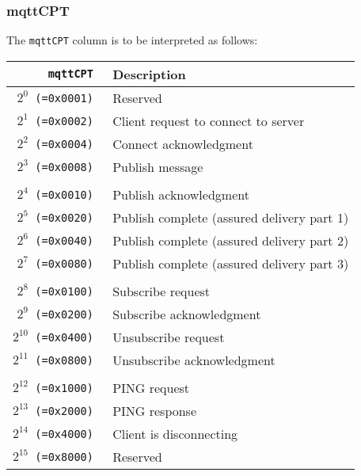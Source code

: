 \documentclass[documentation]{subfiles}
\begin{document}
\subsubsection{mqttCPT}\label{mqttCPT}
The {\tt mqttCPT} column is to be interpreted as follows:\\
\begin{longtable}{>{\tt}rl}
    \toprule
    {\bf mqttCPT}      & {\bf Description}\\
    \midrule\endhead%
    $2^{0}$  (=0x0001) & Reserved\\
    $2^{1}$  (=0x0002) & Client request to connect to server\\
    $2^{2}$  (=0x0004) & Connect acknowledgment\\
    $2^{3}$  (=0x0008) & Publish message\\
    \\
    $2^{4}$  (=0x0010) & Publish acknowledgment\\
    $2^{5}$  (=0x0020) & Publish complete (assured delivery part 1)\\
    $2^{6}$  (=0x0040) & Publish complete (assured delivery part 2)\\
    $2^{7}$  (=0x0080) & Publish complete (assured delivery part 3)\\
    \\
    $2^{8}$  (=0x0100) & Subscribe request\\
    $2^{9}$  (=0x0200) & Subscribe acknowledgment\\
    $2^{10}$ (=0x0400) & Unsubscribe request\\
    $2^{11}$ (=0x0800) & Unsubscribe acknowledgment\\
    \\
    $2^{12}$ (=0x1000) & PING request\\
    $2^{13}$ (=0x2000) & PING response\\
    $2^{14}$ (=0x4000) & Client is disconnecting\\
    $2^{15}$ (=0x8000) & Reserved\\
    \bottomrule
\end{longtable}
\end{document}

